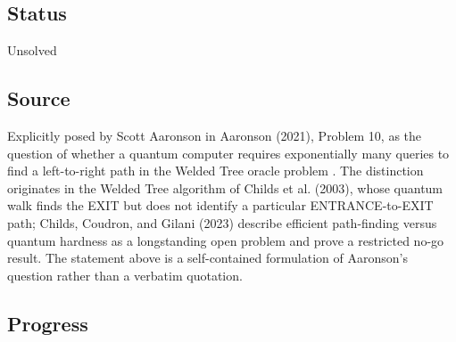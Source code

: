 \subsection*{Status}

Unsolved

\subsection*{Source}

Explicitly posed by Scott Aaronson in Aaronson (2021), Problem 10, as the
question of whether a quantum computer requires exponentially many queries
to find a left-to-right path in the Welded Tree oracle problem
.  The distinction originates in the
Welded Tree algorithm of Childs et al. (2003), whose quantum walk finds the
EXIT but does not identify a particular ENTRANCE-to-EXIT path; Childs,
Coudron, and Gilani (2023) describe efficient path-finding versus quantum
hardness as a longstanding open problem and prove a restricted no-go result.
The statement above is a self-contained formulation of Aaronson's question
rather than a verbatim quotation.

\subsection*{Progress}

